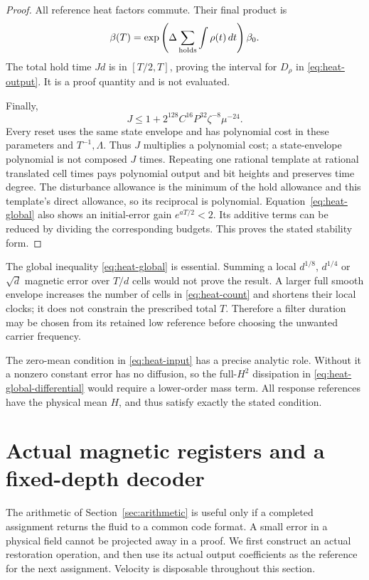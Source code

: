 \documentclass[11pt,a4paper]{amsart}
\theoremstyle{definition}
\theoremstyle{remark}
\numberwithin{equation}{section}
\begin{document}
\begin{proof}
All reference heat factors commute.  Their final product is
\[
 \beta(T)=\exp\left(\Delta
        \sum_{\rm holds}\int\rho(t)\,dt\right)\beta_0.
\]
The total hold time $Jd$ is in $[T/2,T]$, proving the interval for
$D_\rho$ in \eqref{eq:heat-output}.  It is a proof quantity and is
not evaluated.

Finally,
\begin{equation}\label{eq:heat-count}
 J\le1+2^{128}C^{16}P^{32}\zeta^{-8}\mu^{-24}.
\end{equation}
Every reset uses the same state envelope and has polynomial cost in
these parameters and $T^{-1},\Lambda$.  Thus $J$ multiplies a
polynomial cost; a state-envelope polynomial is not composed $J$ times.
Repeating one rational template at rational translated cell times pays
polynomial output and bit heights and preserves time degree.  The
disturbance allowance is the minimum of the hold allowance and this
template's direct allowance, so its reciprocal is polynomial.
Equation~\eqref{eq:heat-global} also shows an initial-error gain
$e^{aT/2}<2$.  Its additive terms can be reduced by dividing the
corresponding budgets.  This proves the stated stability form.
\end{proof}

The global inequality \eqref{eq:heat-global} is essential.  Summing a
local $d^{1/8}$, $d^{1/4}$ or $\sqrt d$ magnetic error over $T/d$ cells
would not prove the result.  A larger full smooth envelope increases
the number of cells in \eqref{eq:heat-count} and shortens their local
clocks; it does not constrain the prescribed total $T$.  Therefore a
filter duration may be chosen from its retained low reference before
choosing the unwanted carrier frequency.

The zero-mean condition in \eqref{eq:heat-input} has a precise analytic
role.  Without it a nonzero constant error has no diffusion, so the
full-$H^2$ dissipation in \eqref{eq:heat-global-differential} would require
a lower-order mass term.  All response references have the physical
mean $H$, and thus satisfy exactly the stated condition.

\section{Actual magnetic registers and a fixed-depth decoder}\label{sec:registers}
The arithmetic of Section~\ref{sec:arithmetic} is useful only if a completed
assignment returns the fluid to a common code format.  A small error in a
physical field cannot be projected away in a proof.  We first construct an
actual restoration operation, and then use its actual output coefficients
as the reference for the next assignment.  Velocity is disposable throughout
this section.
\end{document}
